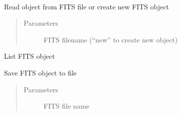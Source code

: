 \documentclass[letterpaper,10pt,english]{sphinxmanual}
\begin{document}
\begin{fulllineitems}
\label{\detokenize{qfits_functions:qfits.fitsfile}}~

\begin{fulllineitems}
\label{\detokenize{qfits_functions:qfits.fitsfile.__init__}}
Read object from FITS file or create new FITS object
\begin{quote}\begin{description}
\item[{Parameters}] \leavevmode
{} \textendash{} FITS filename (“new” to create new object)

\end{description}\end{quote}

\end{fulllineitems}


\begin{fulllineitems}
\label{\detokenize{qfits_functions:qfits.fitsfile.display}}
List FITS object

\end{fulllineitems}


\begin{fulllineitems}
\label{\detokenize{qfits_functions:qfits.fitsfile.save}}
Save FITS object to file
\begin{quote}\begin{description}
\item[{Parameters}] \leavevmode
{} \textendash{} FITS file name

\end{description}\end{quote}

\end{fulllineitems}


\end{fulllineitems}
\end{document}
